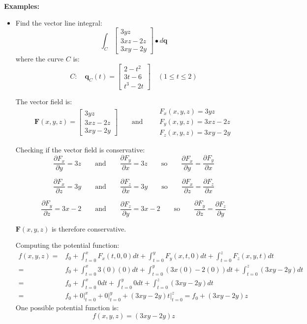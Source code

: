 \documentclass{article}
\begin{document}
\vspace{5mm}

\textbf{Examples:}

\begin{itemize}
\item
Find the vector line integral: 
\[\int_C \begin{bmatrix}
3yz \\ 
3xz - 2z \\ 
3xy - 2y
\end{bmatrix} \bullet d\mathbf{q}\]
where the curve \(C\) is:
\[C : \quad \mathbf{q}_C(t) = \begin{bmatrix}
2 - t^2 \\ 
3t - 6 \\ 
t^3 - 2t
\end{bmatrix} \quad 
(1 \leq t \leq 2)\]
 
The vector field is:
\[\mathbf{F}(x,y,z) = \begin{bmatrix}
3yz \\ 
3xz - 2z \\ 
3xy - 2y
\end{bmatrix} \quad\quad\text{and}\quad\quad \begin{array}{l} 
F_x(x,y,z) = 3yz \\ 
F_y(x,y,z) = 3xz - 2z \\ 
F_z(x,y,z) = 3xy - 2y
\end{array}\]

Checking if the vector field is conservative:
\[\frac{\partial F_x}{\partial y} = 3z \quad\quad\text{and}\quad\quad \frac{\partial F_y}{\partial x} = 3z \quad\quad\text{so}\quad\quad \frac{\partial F_x}{\partial y} = \frac{\partial F_y}{\partial x}\]

\[\frac{\partial F_x}{\partial z} = 3y \quad\quad\text{and}\quad\quad \frac{\partial F_z}{\partial x} = 3y \quad\quad\text{so}\quad\quad \frac{\partial F_x}{\partial z} = \frac{\partial F_z}{\partial x}\]

\[\frac{\partial F_y}{\partial z} = 3x - 2 \quad\quad\text{and}\quad\quad \frac{\partial F_z}{\partial y} = 3x - 2 \quad\quad\text{so}\quad\quad \frac{\partial F_y}{\partial z} = \frac{\partial F_z}{\partial y}\]

\(\mathbf{F}(x,y,z)\) is therefore conservative. 

Computing the potential function:
\begin{align*}
f(x,y,z) = & f_0 + \int_{t = 0}^x F_x(t,0,0)dt + \int_{t=0}^y F_y(x,t,0)dt + \int_{t=0}^z F_z(x,y,t)dt \\  
= & f_0 + \int_{t = 0}^x 3(0)(0)dt + \int_{t = 0}^y (3x(0) - 2(0))dt + \int_{t = 0}^z (3xy - 2y)dt \\ 
= & f_0 + \int_{t = 0}^x 0 dt + \int_{t = 0}^y 0 dt + \int_{t = 0}^z (3xy - 2y)dt \\
= & f_0 + 0\Big|_{t = 0}^x + 0\Big|_{t = 0}^y + (3xy - 2y)t\Big|_{t = 0}^z 
= f_0 + (3xy - 2y)z 
\end{align*}
One possible potential function is: 
\[f(x,y,z) = (3xy - 2y)z\]


\end{itemize}
\end{document}
